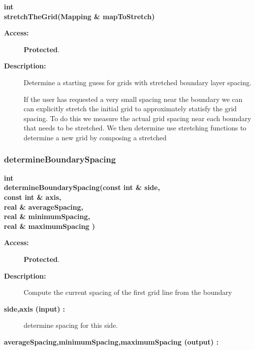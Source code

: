 \begin{flushleft} \textbf{%
int  \\ 
\settowidth{\EllipticGridGeneratorIncludeArgIndent}{stretchTheGrid(}%
stretchTheGrid(Mapping \& mapToStretch)
}\end{flushleft}
\begin{description}
\item[{\bf Access:}]  {\bf Protected}.
\item[{\bf Description:}] 

   Determine a starting guess for grids with stretched boundary layer spacing.

  If the user has requested a very small spacing near the boundary we can
 can explicitly stretch the initial grid to approximately statisfy the grid spacing.
 To do this we measure the actual grid spacing near each boundary that needs to be stretched.
 We then determine use stretching functions to determine a new grid by composing a 
 stretched
 
 
 
 
\end{description}
\subsubsection{determineBoundarySpacing}
 
\begin{flushleft} \textbf{%
int  \\ 
\settowidth{\EllipticGridGeneratorIncludeArgIndent}{determineBoundarySpacing(}%
determineBoundarySpacing(const int \& side, \\ 
\hspace{\EllipticGridGeneratorIncludeArgIndent}const int \& axis,\\ 
\hspace{\EllipticGridGeneratorIncludeArgIndent}real \& averageSpacing,\\ 
\hspace{\EllipticGridGeneratorIncludeArgIndent}real \& minimumSpacing,\\ 
\hspace{\EllipticGridGeneratorIncludeArgIndent}real \& maximumSpacing )
}\end{flushleft}
\begin{description}
\item[{\bf Access:}]  {\bf Protected}.
\item[{\bf Description:}] 
   Compute the current spacing of the first grid line from the boundary
    
\item[{\bf side,axis (input) :}]  determine spacing for this side.
\item[{\bf averageSpacing,minimumSpacing,maximumSpacing (output) :}] 

\end{description}
